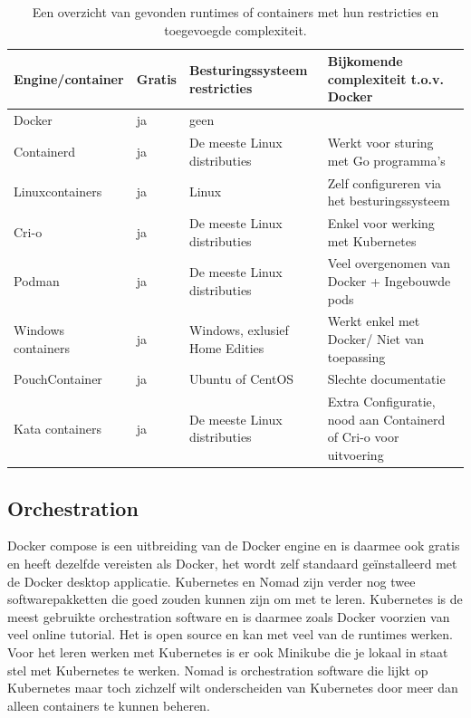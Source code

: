 \begin{center}
    \begin{table}
    \begin{tabular}{ m{3.5cm} || m{1cm} | m{3.3cm} | m{4.5cm} }
        Engine/container & Gratis & Besturingssysteem restricties & Bijkomende complexiteit t.o.v. Docker \\ 
        \hline
        Docker & ja & geen &  \\  
        \hline
        Containerd & ja & De meeste Linux distributies & Werkt voor sturing met Go programma’s \\
        \hline 
        Linuxcontainers & ja & Linux & Zelf configureren via het besturingssysteem \\
        \hline
        Cri-o & ja & De meeste Linux distributies & Enkel voor werking met Kubernetes \\
        \hline
        Podman & ja & De meeste Linux distributies & Veel overgenomen van Docker + Ingebouwde pods \\
        \hline
        Windows containers & ja & Windows, exlusief Home Edities & Werkt enkel met Docker/ Niet van toepassing \\
        \hline
        PouchContainer & ja & Ubuntu of CentOS & Slechte documentatie \\
        \hline
        Kata containers & ja & De meeste Linux distributies & Extra Configuratie, nood aan Containerd of Cri-o voor uitvoering \\
    \end{tabular}
    \label{tab:Engines}
    \caption[Overzicht Runtimes en containers]{Een overzicht van gevonden runtimes of containers met hun restricties en toegevoegde complexiteit.}
    \end{table}
\end{center}

\subsection{Orchestration}
Docker compose is een uitbreiding van de Docker engine en is daarmee ook gratis en heeft dezelfde vereisten als Docker, het wordt zelf standaard geïnstalleerd met de Docker desktop applicatie. Kubernetes en Nomad zijn verder nog twee softwarepakketten die goed zouden kunnen zijn om met te leren. Kubernetes is de meest gebruikte orchestration software en is daarmee zoals Docker voorzien van veel online tutorial. Het is open source en kan met veel van de runtimes werken. Voor het leren werken met Kubernetes is er ook Minikube die je lokaal in staat stel met Kubernetes te werken. Nomad is orchestration software die lijkt op Kubernetes maar toch zichzelf wilt onderscheiden van Kubernetes door meer dan alleen containers te kunnen beheren. 


